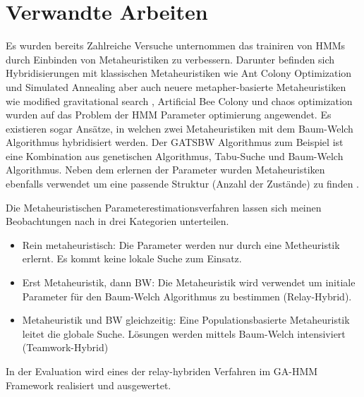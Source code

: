 \chapter{Verwandte Arbeiten}

Es wurden bereits Zahlreiche Versuche unternommen das trainiren von HMMs durch Einbinden von Metaheuristiken zu verbessern. Darunter befinden sich Hybridisierungen mit klassischen Metaheuristiken wie Ant Colony Optimization \cite*{LiteratureReviewACO} und Simulated Annealing \cite*{LiteratureReviewSA} aber auch neuere metapher-basierte Metaheuristiken wie modified gravitational search \cite*{LiteratureReviewMGS}, Artificial Bee Colony \cite*{LiteratureReviewABC} und chaos optimization \cite*{LiteratureReviewCO} wurden auf das Problem der HMM Parameter optimierung angewendet. Es existieren sogar Ansätze, in welchen zwei Metaheuristiken mit dem Baum-Welch Algorithmus hybridisiert werden. Der GATSBW Algorithmus \cite*{LiteratureReviewGATSBW} zum Beispiel ist eine Kombination aus genetischen Algorithmus, Tabu-Suche und Baum-Welch Algorithmus. Neben dem erlernen der Parameter wurden Metaheuristiken ebenfalls verwendet um eine passende Struktur (Anzahl der Zustände) zu finden \cite*{LiteratureReviewStructure}.

Die Metaheuristischen Parameterestimationsverfahren lassen sich meinen Beobachtungen nach in drei Kategorien unterteilen.
\begin{itemize}
    \item Rein metaheuristisch: Die Parameter werden nur durch eine Metheuristik erlernt. Es kommt keine lokale Suche zum Einsatz.
    \item Erst Metaheuristik, dann BW: Die Metaheuristik wird verwendet um initiale Parameter für den Baum-Welch Algorithmus zu bestimmen (Relay-Hybrid).
    \item Metaheuristik und BW gleichzeitig: Eine Populationsbasierte Metaheuristik leitet die globale Suche. Lösungen werden mittels Baum-Welch intensiviert (Teamwork-Hybrid) 
\end{itemize}
In der Evaluation wird eines der relay-hybriden Verfahren im GA-HMM Framework realisiert und ausgewertet.